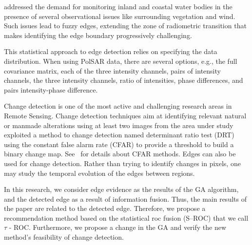 \documentclass[remotesensing,article,submit,pdftex,moreauthors]{Definitions/mdpi}
\begin{document}
\citet{rey_sar_frery_del} addressed the demand for monitoring inland and coastal water bodies in the presence of several observational issues like surrounding vegetation and wind.
Such issues lead to fuzzy edges, extending the zone of radiometric transition that makes identifying the edge boundary progressively challenging.

This statistical approach to edge detection relies on specifying the data distribution.
When using PolSAR data, there are several options, e.g., the full covariance matrix, each of the three intensity channels, pairs of intensity channels, the three intensity channels, ratio of intensities, phase differences, and pairs intensity-phase difference.

Change detection is one of the most active and challenging research areas in Remote Sensing.
Change detection techniques aim at identifying relevant natural or manmade alterations using at least two images from the area under study~\citep{ChangeDetectionTechniquesforRemoteSensingApplicationsaSurvey}
\citet{nvs} exploited a method to change detection named determinant ratio test (DRT) using the constant false alarm rate (CFAR) to provide a threshold to build a binary change map. See~\citet{touzi1988,ssnc} for details about CFAR methods.
Edges can also be used for change detection.
Rather than trying to identify changes in pixels, one may study the temporal evolution of the edges between regions.

In this research, we consider edge evidence as the results of the GA algorithm, and the detected edge as a result of information fusion. Thus, the main results of the paper are related to the detected edge. Therefore, we propose a recommendation method based on the statistical roc fusion (S--ROC) that we call $\tau$ - ROC. Furthermore, we propose a change in the GA and verify the new method's feasibility of change detection.
\end{document}
